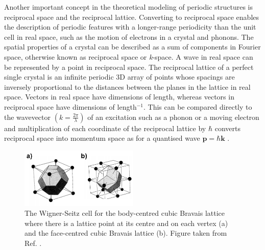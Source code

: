 \documentclass[11pt, twoside]{report}
\begin{document}
Another important concept in the theoretical modeling of periodic structures is reciprocal space and the reciprocal lattice. 
Converting to reciprocal space enables the description of periodic features with a longer-range periodicity than the unit cell in real space, such as the motion of electrons in a crystal and phonons.
The spatial properties of a crystal can be described as a sum of components in Fourier space, otherwise known as reciprocal space or \textit{k}-space. A wave in real space can be represented by a point in reciprocal space. The reciprocal lattice of a perfect single crystal is an infinite periodic 3D array of points whose spacings are inversely proportional to the distances between the planes in the lattice in real space. Vectors in real space have dimensions of length, whereas vectors in reciprocal space have dimensions of length$^{-1}$. This can be compared directly to the wavevector $ \left(k  = \frac{2\pi}{\lambda} \right)$ of an excitation such as a phonon or a moving electron and multiplication of each coordinate of the reciprocal lattice by $\hbar$ converts reciprocal space into momentum space as for a quantised wave $\mathbf{p} = \hbar \mathbf{k}$ \cite{Blakemore1}. 

\begin{figure}[h!]
  \centering
    \includegraphics[width=0.5\textwidth]{figures/Wigner-Seitz.png}
    \caption[The Wigner-Seitz cell for the body-centred cubic Bravais lattice where there is a lattice point at its centre and on each vertex (a) and the face-centred cubic Bravais lattice (b).]{The Wigner-Seitz cell for the body-centred cubic Bravais lattice where there is a lattice point at its centre and on each vertex (a) and the face-centred cubic Bravais lattice (b). 
    Figure taken from Ref. .}
  \label{Wigner-Seitz}
\end{figure}
\end{document}
